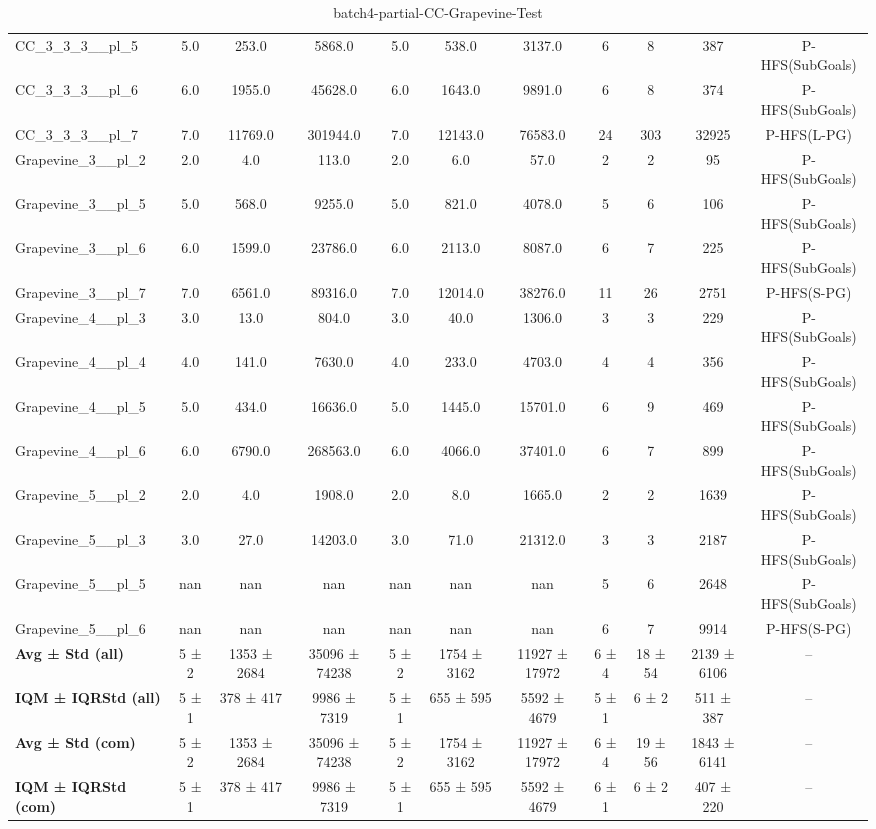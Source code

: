 \begin{table}[!ht]
\begin{tabular}{l|ccc|ccc|cccc}
CC\_3\_3\_3\_\_pl\_5 & 5.0 & 253.0 & 5868.0 & 5.0 & 538.0 & 3137.0 & 6 & 8 & 387 & P-HFS(SubGoals) \\
CC\_3\_3\_3\_\_pl\_6 & 6.0 & 1955.0 & 45628.0 & 6.0 & 1643.0 & 9891.0 & 6 & 8 & 374 & P-HFS(SubGoals) \\
CC\_3\_3\_3\_\_pl\_7 & 7.0 & 11769.0 & 301944.0 & 7.0 & 12143.0 & 76583.0 & 24 & 303 & 32925 & P-HFS(L-PG) \\
Grapevine\_3\_\_pl\_2 & 2.0 & 4.0 & 113.0 & 2.0 & 6.0 & 57.0 & 2 & 2 & 95 & P-HFS(SubGoals) \\
Grapevine\_3\_\_pl\_5 & 5.0 & 568.0 & 9255.0 & 5.0 & 821.0 & 4078.0 & 5 & 6 & 106 & P-HFS(SubGoals) \\
Grapevine\_3\_\_pl\_6 & 6.0 & 1599.0 & 23786.0 & 6.0 & 2113.0 & 8087.0 & 6 & 7 & 225 & P-HFS(SubGoals) \\
Grapevine\_3\_\_pl\_7 & 7.0 & 6561.0 & 89316.0 & 7.0 & 12014.0 & 38276.0 & 11 & 26 & 2751 & P-HFS(S-PG) \\
Grapevine\_4\_\_pl\_3 & 3.0 & 13.0 & 804.0 & 3.0 & 40.0 & 1306.0 & 3 & 3 & 229 & P-HFS(SubGoals) \\
Grapevine\_4\_\_pl\_4 & 4.0 & 141.0 & 7630.0 & 4.0 & 233.0 & 4703.0 & 4 & 4 & 356 & P-HFS(SubGoals) \\
Grapevine\_4\_\_pl\_5 & 5.0 & 434.0 & 16636.0 & 5.0 & 1445.0 & 15701.0 & 6 & 9 & 469 & P-HFS(SubGoals) \\
Grapevine\_4\_\_pl\_6 & 6.0 & 6790.0 & 268563.0 & 6.0 & 4066.0 & 37401.0 & 6 & 7 & 899 & P-HFS(SubGoals) \\
Grapevine\_5\_\_pl\_2 & 2.0 & 4.0 & 1908.0 & 2.0 & 8.0 & 1665.0 & 2 & 2 & 1639 & P-HFS(SubGoals) \\
Grapevine\_5\_\_pl\_3 & 3.0 & 27.0 & 14203.0 & 3.0 & 71.0 & 21312.0 & 3 & 3 & 2187 & P-HFS(SubGoals) \\
Grapevine\_5\_\_pl\_5 & nan & nan & nan & nan & nan & nan & 5 & 6 & 2648 & P-HFS(SubGoals) \\
Grapevine\_5\_\_pl\_6 & nan & nan & nan & nan & nan & nan & 6 & 7 & 9914 & P-HFS(S-PG) \\
\hline
\textbf{Avg ± Std (all)} & 5 ± 2 & 1353 ± 2684 & 35096 ± 74238 & 5 ± 2 & 1754 ± 3162 & 11927 ± 17972 & 6 ± 4 & 18 ± 54 & 2139 ± 6106 & -- \\
\textbf{IQM ± IQRStd (all)} & 5 ± 1 & 378 ± 417 & 9986 ± 7319 & 5 ± 1 & 655 ± 595 & 5592 ± 4679 & 5 ± 1 & 6 ± 2 & 511 ± 387 & -- \\
\textbf{Avg ± Std (com)} & 5 ± 2 & 1353 ± 2684 & 35096 ± 74238 & 5 ± 2 & 1754 ± 3162 & 11927 ± 17972 & 6 ± 4 & 19 ± 56 & 1843 ± 6141 & -- \\
\textbf{IQM ± IQRStd (com)} & 5 ± 1 & 378 ± 417 & 9986 ± 7319 & 5 ± 1 & 655 ± 595 & 5592 ± 4679 & 6 ± 1 & 6 ± 2 & 407 ± 220 & -- \\
\end{tabular}
\caption{batch4-partial-CC-Grapevine-Test}
\label{tab:batch4_partial_CC-Grapevine_comparison_test}
\end{table}